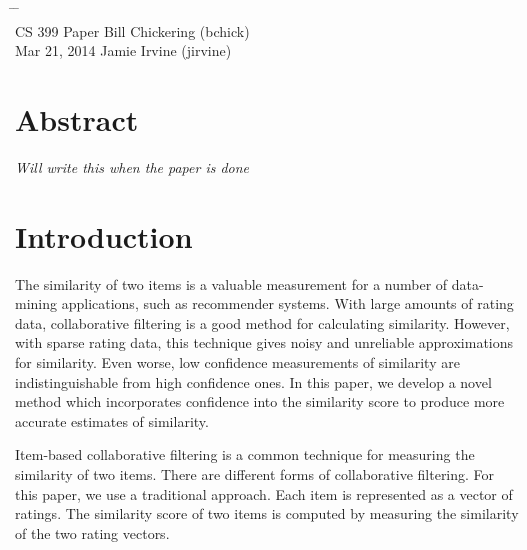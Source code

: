 \documentclass[10pt]{article}
\begin{document}

{\LARGE\bf
\begin{tabbing}
\hspace{2.8in} \= \hspace{1.3in} \= \hspace{1.2in} \= \\

CS 399 \> Paper \> Bill Chickering (bchick)\\
\normalsize Mar 21, 2014 \> \> Jamie Irvine (jirvine)
\end{tabbing}
} \vspace{.4in}

\section*{Abstract}
\emph{Will write this when the paper is done}

\section*{Introduction}
The similarity of two items is a valuable measurement for a number of
data-mining applications, such as recommender systems. With large
amounts of rating data, collaborative filtering is a good method for
calculating similarity. However, with sparse rating data, this
technique gives noisy and unreliable approximations for similarity. Even worse, 
low confidence measurements of similarity are indistinguishable from high
confidence ones. In this paper, we develop a novel method which incorporates
confidence into the similarity score to produce more accurate estimates of
similarity.
 
Item-based collaborative filtering is a common technique for measuring the similarity 
of two items. There are different forms of collaborative filtering. For
this paper, we use a traditional approach. Each item is represented as a vector
of ratings. The similarity score of two items is computed by measuring the similarity
of the two rating vectors.
\end{document}
